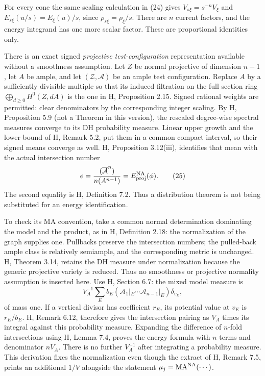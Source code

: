 \documentclass[
  11pt,
]{article}
\begin{document}
For every cone the same scaling calculation in (24) gives
\(V_{s\xi}=s^{-n}V_\xi\) and \(E_{s\xi}(u/s)=E_\xi(u)/s\), since
\(\rho_{s\xi}=\rho_\xi/s\). There are \(n\) current factors, and the
energy integrand has one more scalar factor. These are proportional
identities only.

There is an exact signed \emph{projective test-configuration}
representation available without a smoothness assumption. Let \(Z\) be
normal projective of dimension \(n-1\), let \(A\) be ample, and let
\((\mathcal Z,\mathcal A)\) be an ample test configuration. Replace
\(A\) by a sufficiently divisible multiple so that its induced
filtration on the full section ring \(\bigoplus_{d\geq0}H^0(Z,dA)\) is
the one in H, Proposition 2.15. Signed rational weights are permitted:
clear denominators by the corresponding integer scaling. By H,
Proposition 5.9 (not a Theorem in this version), the rescaled
degree-wise spectral measures converge to its DH probability measure.
Linear upper growth and the lower bound of H, Remark 5.2, put them in a
common compact interval, so their signed means converge as well. H,
Proposition 3.12(iii), identifies that mean with the actual intersection
number \[
 e=\frac{(\overline{\mathcal A}^{n})}{n(A^{n-1})}
   =E^{\rm NA}_{\rm proj}(\phi).                    \tag{25}
\] The second equality is H, Definition 7.2. Thus a distribution theorem
is not being substituted for an energy identification.

To check its MA convention, take a common normal determination
dominating the model and the product, as in H, Definition 2.18: the
normalization of the graph supplies one. Pullbacks preserve the
intersection numbers; the pulled-back ample class is relatively
semiample, and the corresponding metric is unchanged. H, Theorem 3.14,
retains the DH measure under normalization because the generic
projective variety is reduced. Thus no smoothness or projective
normality assumption is inserted here. Use H, Section 6.7: the mixed
model measure is \[
 V_A^{-1}\sum_E b_E(\mathcal A_1|_E\cdots
                  \mathcal A_{n-1}|_E)\delta_{v_E},
\] of mass one. If a vertical divisor has coefficient \(r_E\), its
potential value at \(v_E\) is \(r_E/b_E\). H, Remark 6.12, therefore
gives the intersection pairing as \(V_A\) times its integral against
this probability measure. Expanding the difference of \(n\)-fold
intersections using H, Lemma 7.4, proves the energy formula with \(n\)
terms and denominator \(nV_A\). There is no further \(V_A^{-1}\) after
integrating a probability measure. This derivation fixes the
normalization even though the extract of H, Remark 7.5, prints an
additional \(1/V\) alongside the statement
\(\mu_j=\operatorname{MA}^{\rm NA}(\cdots)\).
\end{document}
